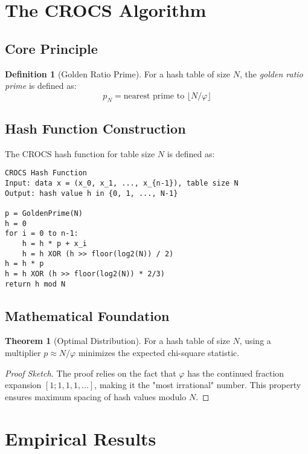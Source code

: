 \documentclass[11pt,a4paper]{article}
\theoremstyle{definition}
\newtheorem{definition}{Definition}
\newtheorem{theorem}{Theorem}
\newcommand{\crocs}{\textsc{CROCS}}
\begin{document}
\section{The CROCS Algorithm}

\subsection{Core Principle}

\begin{definition}[Golden Ratio Prime]
For a hash table of size $N$, the \emph{golden ratio prime} is defined as:
$$p_N = \text{nearest prime to } \lfloor N/\varphi \rfloor$$
\end{definition}

\subsection{Hash Function Construction}

The \crocs{} hash function for table size $N$ is defined as:

\begin{verbatim}
CROCS Hash Function
Input: data x = (x_0, x_1, ..., x_{n-1}), table size N
Output: hash value h in {0, 1, ..., N-1}

p = GoldenPrime(N)
h = 0
for i = 0 to n-1:
    h = h * p + x_i
    h = h XOR (h >> floor(log2(N)) / 2)
h = h * p
h = h XOR (h >> floor(log2(N)) * 2/3)
return h mod N
\end{verbatim}

\subsection{Mathematical Foundation}

\begin{theorem}[Optimal Distribution]
For a hash table of size $N$, using a multiplier $p \approx N/\varphi$ minimizes the expected chi-square statistic.
\end{theorem}

\begin{proof}[Proof Sketch]
The proof relies on the fact that $\varphi$ has the continued fraction expansion $[1; 1, 1, 1, \ldots]$, making it the "most irrational" number. This property ensures maximum spacing of hash values modulo $N$.
\end{proof}

\section{Empirical Results}
\end{document}
